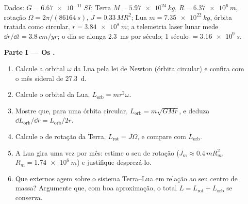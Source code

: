 \begin{problem}
\label{pb:b1:angular-momentum:1}
Dados: $G = \qty{6.67e-11}{SI}$; Terra $M = \qty{5.97e24}{kg}$, $R =
\qty{6.37e6}{m}$, rotação $\Omega = 2\pi/(\qty{86164}{s})$, 
$J = 0.33\,MR^2$; Lua $m = \qty{7.35e22}{kg}$, órbita tratada como
circular, $r = \qty{3.84e8}{m}$; a telemetria laser lunar mede
$\dd r/\dd t = \qty{3.8}{cm/yr}$; o dia se alonga \qty{2.3}{ms} por
século; $1$ século $= \qty{3.16e9}{s}$.

\medskip
\noindent\textbf{Parte I --- Os .}
\begin{enumerate}
  \item Calcule a  orbital $\omega$ da Lua pela
        lei de Newton (órbita circular) e confira com o
        mês sideral de \qty{27.3}{d}.
  \item Calcule o  orbital da Lua, $L_{\text{orb}} =
        mr^2\omega$.
  \item Mostre que, para uma órbita circular, $L_{\text{orb}} = m\sqrt{GMr}$, e
        deduza $\dd L_{\text{orb}}/\dd r = L_{\text{orb}}/2r$.
  \item Calcule o  de rotação da Terra, $L_{\text{rot}} =
        J\Omega$, e compare com $L_{\text{orb}}$.
  \item A Lua gira uma vez por mês: estime o seu  de
        rotação ($J_m \approx 0.4\,mR_m^2$, $R_m = \qty{1.74e6}{m}$) e
        justifique desprezá-lo.
  \item Que  externos agem sobre o sistema Terra--Lua em relação ao seu
        centro de massa? Argumente que, com boa aproximação, o total
        $L = L_{\text{rot}} + L_{\text{orb}}$ se conserva.
\end{enumerate}


\end{problem}
